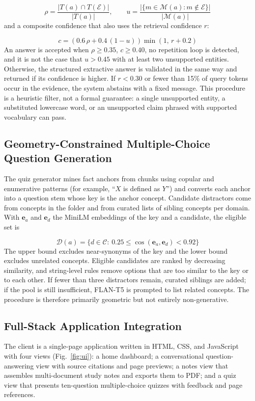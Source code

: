 \documentclass[conference]{IEEEtran}
\begin{document}
\begin{equation}
\rho=\frac{|T(a)\cap T(\mathcal{E})|}{|T(a)|},\qquad u=\frac{|\{m\in\mathcal{M}(a):m\notin\mathcal{E}\}|}{|\mathcal{M}(a)|}
\label{eq:ground}
\end{equation}
and a composite confidence that also uses the retrieval confidence $r$:

\begin{equation}
c=\left(0.6\,\rho+0.4\,(1-u)\right)\min(1,\,r+0.2)
\label{eq:conf}
\end{equation}
An answer is accepted when $\rho\geq0.35$, $c\geq0.40$, no repetition loop is detected, and it is not the case that $u>0.45$ with at least two unsupported entities. Otherwise, the structured extractive answer is validated in the same way and returned if its confidence is higher. If $r<0.30$ or fewer than 15\% of query tokens occur in the evidence, the system abstains with a fixed message. This procedure is a heuristic filter, not a formal guarantee: a single unsupported entity, a substituted lowercase word, or an unsupported claim phrased with supported vocabulary can pass.

\subsection{Geometry-Constrained Multiple-Choice Question Generation}
The quiz generator mines fact anchors from chunks using copular and enumerative patterns (for example, ``$X$ is defined as $Y$'') and converts each anchor into a question stem whose key is the anchor concept. Candidate distractors come from concepts in the folder and from curated lists of sibling concepts per domain. With $\mathbf{e}_a$ and $\mathbf{e}_d$ the MiniLM embeddings of the key and a candidate, the eligible set is

\begin{equation}
\mathcal{D}(a)=\{d\in\mathcal{C}:\ 0.25\leq\cos(\mathbf{e}_a,\mathbf{e}_d)<0.92\}
\label{eq:band}
\end{equation}
The upper bound excludes near-synonyms of the key and the lower bound excludes unrelated concepts. Eligible candidates are ranked by decreasing similarity, and string-level rules remove options that are too similar to the key or to each other. If fewer than three distractors remain, curated siblings are added; if the pool is still insufficient, FLAN-T5 is prompted to list related concepts. The procedure is therefore primarily geometric but not entirely non-generative.

\subsection{Full-Stack Application Integration}
The client is a single-page application written in HTML, CSS, and JavaScript with four views (Fig.~\ref{fig:ui}): a home dashboard; a conversational question-answering view with source citations and page previews; a notes view that assembles multi-document study notes and exports them to PDF; and a quiz view that presents ten-question multiple-choice quizzes with feedback and page references.
\end{document}
